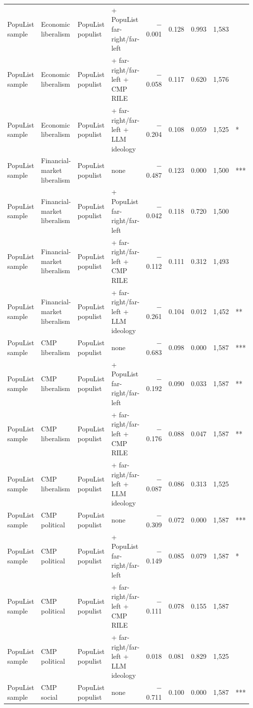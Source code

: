 \begin{table}[ht]
{\begin{tabular}{llllrrrrl}
PopuList sample & Economic liberalism & PopuList populist & + PopuList far-right/far-left & $-$0.001 & 0.128 & 0.993 & 1,583 &  \\
PopuList sample & Economic liberalism & PopuList populist & + far-right/far-left + CMP RILE & $-$0.058 & 0.117 & 0.620 & 1,576 &  \\
PopuList sample & Economic liberalism & PopuList populist & + far-right/far-left + LLM ideology & $-$0.204 & 0.108 & 0.059 & 1,525 & * \\
PopuList sample & Financial-market liberalism & PopuList populist & none & $-$0.487 & 0.123 & 0.000 & 1,500 & *** \\
PopuList sample & Financial-market liberalism & PopuList populist & + PopuList far-right/far-left & $-$0.042 & 0.118 & 0.720 & 1,500 &  \\
PopuList sample & Financial-market liberalism & PopuList populist & + far-right/far-left + CMP RILE & $-$0.112 & 0.111 & 0.312 & 1,493 &  \\
PopuList sample & Financial-market liberalism & PopuList populist & + far-right/far-left + LLM ideology & $-$0.261 & 0.104 & 0.012 & 1,452 & ** \\
PopuList sample & CMP liberalism & PopuList populist & none & $-$0.683 & 0.098 & 0.000 & 1,587 & *** \\
PopuList sample & CMP liberalism & PopuList populist & + PopuList far-right/far-left & $-$0.192 & 0.090 & 0.033 & 1,587 & ** \\
PopuList sample & CMP liberalism & PopuList populist & + far-right/far-left + CMP RILE & $-$0.176 & 0.088 & 0.047 & 1,587 & ** \\
PopuList sample & CMP liberalism & PopuList populist & + far-right/far-left + LLM ideology & $-$0.087 & 0.086 & 0.313 & 1,525 &  \\
PopuList sample & CMP political & PopuList populist & none & $-$0.309 & 0.072 & 0.000 & 1,587 & *** \\
PopuList sample & CMP political & PopuList populist & + PopuList far-right/far-left & $-$0.149 & 0.085 & 0.079 & 1,587 & * \\
PopuList sample & CMP political & PopuList populist & + far-right/far-left + CMP RILE & $-$0.111 & 0.078 & 0.155 & 1,587 &  \\
PopuList sample & CMP political & PopuList populist & + far-right/far-left + LLM ideology & 0.018 & 0.081 & 0.829 & 1,525 &  \\
PopuList sample & CMP social & PopuList populist & none & $-$0.711 & 0.100 & 0.000 & 1,587 & *** \\

\end{tabular}}
\end{table}
